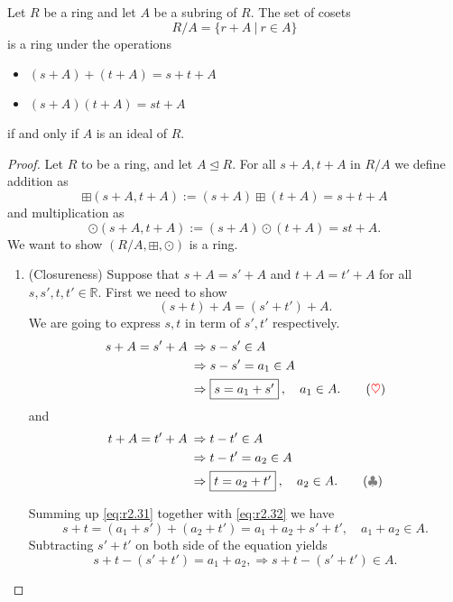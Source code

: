 \begin{theorem}
    Let $R$ be a ring and let $A$ be a subring of $R$. The set of cosets 
    \[
        R/A = \{ r+A \> | \> r \in A \}
    \]
    is a ring under the operations 
    \begin{itemize}
        \item $(s+A) + (t+A) = s + t + A$
        \item $(s+A)(t+A) = st + A$
    \end{itemize}
    if and only if $A$ is an ideal of $R$.
\end{theorem}
\begin{proof}
    Let $R$ to be a ring, and let $A \trianglelefteq R$. For all $s+A, t+A$ in $R/A$ we define 
    addition as 
    \[
        \boxplus (s+A, t+A) := (s+A) \boxplus (t + A) = s+t+A
    \]
    and multiplication as 
    \[
        \odot(s+A, t+A) := (s+A) \odot (t + A) = st+A.
    \]
    We want to show $(R/A, \boxplus, \odot)$ is a ring.

    \begin{enumerate}
        \item (Closureness) Suppose that $s + A = s' + A$ and $t+A = t' + A$ for all $s, s', t, t' \in \mathbb{R}$. First we 
        need to show 
        \[
            (s+t) + A = (s' + t')+A. 
        \]
        We are going to express $s, t$ in term of $s', t'$ respectively.
        \begin{align*}
            s + A = s' + A \> &\Rightarrow s - s' \in A\\
            &\Rightarrow s - s' = a_1 \in A\\
            &\Rightarrow \fbox{$s = a_1 + s'$}\>, \quad a_1 \in A. \label{eq:r2.31} \tag{{\color{red} $\heartsuit$}}
        \end{align*}
        and 
        \begin{align*}
            t + A = t' + A \> &\Rightarrow t - t' \in A\\
            &\Rightarrow t - t' = a_2 \in A\\
            &\Rightarrow \fbox{$t = a_2 + t'$}\>, \quad a_2 \in A. \label{eq:r2.32} \tag{{\color{gray} $\clubsuit $}}
        \end{align*}
    
        Summing up \eqref{eq:r2.31} together with \eqref{eq:r2.32} we have 
        \[
            s + t = (a_1 + s') + (a_2 + t') = a_1 + a_2 + s' + t', \quad a_1 + a_2 \in A.
        \]
        Subtracting $s'+t'$ on both side of the equation yields 
        \[
            s+t-(s'+t') = a_1 + a_2, \Longrightarrow s+t-(s'+t') \in A.
        \]
    

\end{enumerate}
\end{proof}
